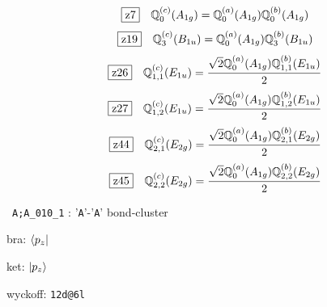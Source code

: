 \documentclass[fleqn,10pt,landscape]{jsarticle}
\begin{document}
\begin{dmath*}
\hspace*{3mm}\fbox{z7}\quad \mathbb{Q}_{0}^{(c)}(A_{1g})=\mathbb{Q}_{0}^{(a)}(A_{1g}) \mathbb{Q}_{0}^{(b)}(A_{1g})
\end{dmath*}
\begin{dmath*}
\hspace*{3mm}\fbox{z19}\quad \mathbb{Q}_{3}^{(c)}(B_{1u})=\mathbb{Q}_{0}^{(a)}(A_{1g}) \mathbb{Q}_{3}^{(b)}(B_{1u})
\end{dmath*}
\begin{dmath*}
\hspace*{3mm}\fbox{z26}\quad \mathbb{Q}_{1,1}^{(c)}(E_{1u})=\frac{\sqrt{2} \mathbb{Q}_{0}^{(a)}(A_{1g}) \mathbb{Q}_{1,1}^{(b)}(E_{1u})}{2}
\end{dmath*}
\begin{dmath*}
\hspace*{3mm}\fbox{z27}\quad \mathbb{Q}_{1,2}^{(c)}(E_{1u})=\frac{\sqrt{2} \mathbb{Q}_{0}^{(a)}(A_{1g}) \mathbb{Q}_{1,2}^{(b)}(E_{1u})}{2}
\end{dmath*}
\begin{dmath*}
\hspace*{3mm}\fbox{z44}\quad \mathbb{Q}_{2,1}^{(c)}(E_{2g})=\frac{\sqrt{2} \mathbb{Q}_{0}^{(a)}(A_{1g}) \mathbb{Q}_{2,1}^{(b)}(E_{2g})}{2}
\end{dmath*}
\begin{dmath*}
\hspace*{3mm}\fbox{z45}\quad \mathbb{Q}_{2,2}^{(c)}(E_{2g})=\frac{\sqrt{2} \mathbb{Q}_{0}^{(a)}(A_{1g}) \mathbb{Q}_{2,2}^{(b)}(E_{2g})}{2}
\end{dmath*}
\vspace{5mm}

\noindent\textbullet\, \texttt{A;A_010_1} : '\texttt{A}'-'\texttt{A}' bond-cluster

\noindent\quad * bra: $\bra{p_{z}}$

\noindent\quad * ket: $\ket{p_{z}}$

\noindent\quad * wyckoff: \texttt{12d@6l}
\end{document}

